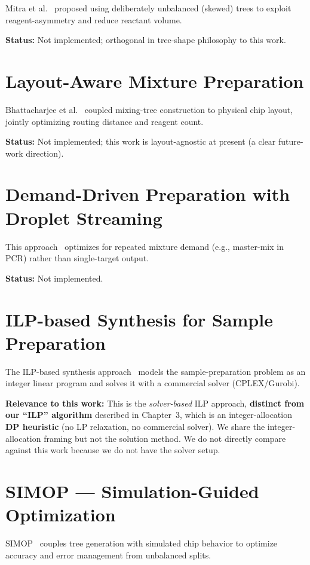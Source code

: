 Mitra et al.~\cite{mitra2013skewed} proposed using deliberately unbalanced (skewed) trees to exploit reagent-asymmetry and reduce reactant volume.

\textbf{Status:} Not implemented; orthogonal in tree-shape philosophy to this work.

\section{Layout-Aware Mixture Preparation}

Bhattacharjee et al.~\cite{bhattacharjee2015layout} coupled mixing-tree construction to physical chip layout, jointly optimizing routing distance and reagent count.

\textbf{Status:} Not implemented; this work is layout-agnostic at present (a clear future-work direction).

\section{Demand-Driven Preparation with Droplet Streaming}

This approach~\cite{dac2014demand} optimizes for repeated mixture demand (e.g., master-mix in PCR) rather than single-target output.

\textbf{Status:} Not implemented.

\section{ILP-based Synthesis for Sample Preparation}

The ILP-based synthesis approach~\cite{ilp_ieee2016} models the sample-preparation problem as an integer linear program and solves it with a commercial solver (CPLEX/Gurobi).

\textbf{Relevance to this work:} This is the \textit{solver-based} ILP approach, \textbf{distinct from our ``ILP'' algorithm} described in Chapter~3, which is an integer-allocation \textbf{DP heuristic} (no LP relaxation, no commercial solver). We share the integer-allocation framing but not the solution method. We do not directly compare against this work because we do not have the solver setup.

\section{SIMOP --- Simulation-Guided Optimization}

SIMOP~\cite{simop2021} couples tree generation with simulated chip behavior to optimize accuracy and error management from unbalanced splits.


